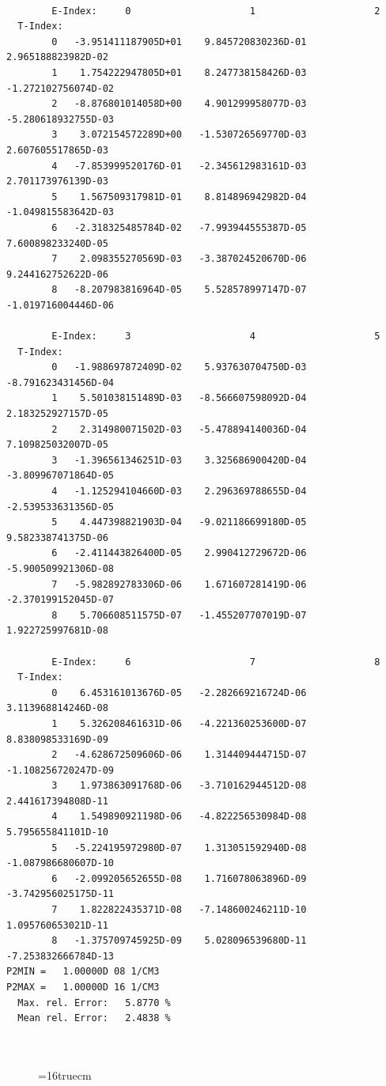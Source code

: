 \documentclass[12pt,dvipdfmx]{article}
\begin{document}
\begin{small}\begin{verbatim}

        E-Index:     0                     1                     2
  T-Index:
        0   -3.951411187905D+01    9.845720830236D-01    2.965188823982D-02
        1    1.754222947805D+01    8.247738158426D-03   -1.272102756074D-02
        2   -8.876801014058D+00    4.901299958077D-03   -5.280618932755D-03
        3    3.072154572289D+00   -1.530726569770D-03    2.607605517865D-03
        4   -7.853999520176D-01   -2.345612983161D-03    2.701173976139D-03
        5    1.567509317981D-01    8.814896942982D-04   -1.049815583642D-03
        6   -2.318325485784D-02   -7.993944555387D-05    7.600898233240D-05
        7    2.098355270569D-03   -3.387024520670D-06    9.244162752622D-06
        8   -8.207983816964D-05    5.528578997147D-07   -1.019716004446D-06

        E-Index:     3                     4                     5
  T-Index:
        0   -1.988697872409D-02    5.937630704750D-03   -8.791623431456D-04
        1    5.501038151489D-03   -8.566607598092D-04    2.183252927157D-05
        2    2.314980071502D-03   -5.478894140036D-04    7.109825032007D-05
        3   -1.396561346251D-03    3.325686900420D-04   -3.809967071864D-05
        4   -1.125294104660D-03    2.296369788655D-04   -2.539533631356D-05
        5    4.447398821903D-04   -9.021186699180D-05    9.582338741375D-06
        6   -2.411443826400D-05    2.990412729672D-06   -5.900509921306D-08
        7   -5.982892783306D-06    1.671607281419D-06   -2.370199152045D-07
        8    5.706608511575D-07   -1.455207707019D-07    1.922725997681D-08

        E-Index:     6                     7                     8
  T-Index:
        0    6.453161013676D-05   -2.282669216724D-06    3.113968814246D-08
        1    5.326208461631D-06   -4.221360253600D-07    8.838098533169D-09
        2   -4.628672509606D-06    1.314409444715D-07   -1.108256720247D-09
        3    1.973863091768D-06   -3.710162944512D-08    2.441617394808D-11
        4    1.549890921198D-06   -4.822256530984D-08    5.795655841101D-10
        5   -5.224195972980D-07    1.313051592940D-08   -1.087986680607D-10
        6   -2.099205652655D-08    1.716078063896D-09   -3.742956025175D-11
        7    1.822822435371D-08   -7.148600246211D-10    1.095760653021D-11
        8   -1.375709745925D-09    5.028096539680D-11   -7.253832666784D-13
P2MIN =   1.00000D 08 1/CM3
P2MAX =   1.00000D 16 1/CM3
  Max. rel. Error:   5.8770 %
  Mean rel. Error:   2.4838 %



\end{verbatim}\end{small}
\begin{figure} \label{2.2.5d}
\epsfxsize=16truecm
\end{figure}
\end{document}
